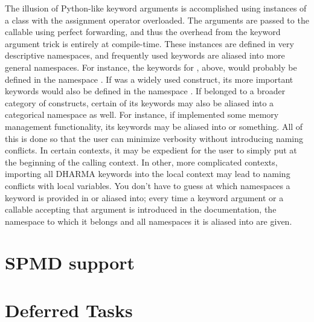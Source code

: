 The illusion of Python-like keyword arguments is accomplished using  instances
of a class with the assignment operator overloaded.  The arguments are passed to the 
callable using perfect forwarding, and thus the overhead from the keyword argument 
trick is entirely at compile-time.  These instances are defined in very descriptive
namespaces, and frequently used keywords are aliased into more general namespaces.  For
instance, the keywords for , above, would probably be defined in the 
namespace .  If  was a 
widely used construct, its more important keywords would also be defined in the namespace
.  If  belonged to a broader category of 
constructs, certain of its keywords may also be aliased into a categorical namespace
as well.  For instance, if  implemented some memory management functionality,
its keywords may be aliased into  or 
something.  All of this is done so that the user can minimize verbosity without introducing
naming conflicts.  In certain contexts, it may be expedient for the user to simply
put  at the beginning of the calling context.  In other,
more complicated contexts, importing all DHARMA keywords into the local context may
lead to naming conflicts with local variables.  You don't have to guess at which namespaces
a keyword is provided in or aliased into; every time a keyword argument or a callable
accepting that argument is introduced in the documentation, the namespace to which 
it belongs and all namespaces it is aliased into are given.



\section{SPMD support}
\label{sec:spmd}






\section{Deferred Tasks}
\label{sec:deferred}

